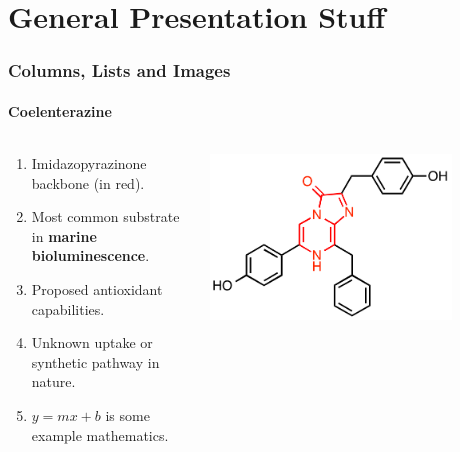 \documentclass[aspectratio=169]{beamer}
\begin{document}
\section{General Presentation Stuff}


\begin{frame}
\frametitle{Columns, Lists and Images}
\framesubtitle{Coelenterazine}
\begin{columns}[T]
\begin{column}{0.5\textwidth}
\begin{enumerate}
   \item Imidazopyrazinone backbone (in red).
   \item Most common substrate in \textbf{marine bioluminescence}.
   \item Proposed antioxidant capabilities.
   \item Unknown uptake or synthetic pathway in nature.
   \item $y=mx+b$ is some example mathematics.
\end{enumerate}
\end{column}
\begin{column}{0.5\textwidth}
\centering
\includegraphics[width=0.8\textwidth]{coelenterazine.png}
\end{column}
\end{columns}
\end{frame}
\end{document}
